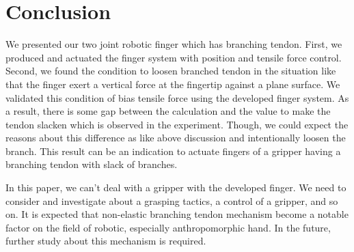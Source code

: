 \documentclass{llncs}
\begin{document}

\section{Conclusion} %
\label{sec:conclusion}
We presented our two joint robotic finger which has branching tendon.
First, we produced and actuated the finger system with position and tensile force control.
Second, we found the condition to loosen branched tendon in the situation like that the finger exert a vertical force at the fingertip against a plane surface.
We validated this condition of bias tensile force using the developed finger system.
As a result, there is some gap between the calculation and the value to make the tendon slacken which is observed in the experiment.
Though, we could expect the reasons about this difference as like above discussion and intentionally loosen the branch.
This result can be an indication to actuate fingers of a gripper having a branching tendon with slack of branches.

In this paper, we can't deal with a gripper with the developed finger.
We need to consider and investigate about a grasping tactics, a control of a gripper, and so on.
It is expected that non-elastic branching tendon mechanism become a notable factor on the field of robotic, especially anthropomorphic hand.
In the future, further study about this mechanism is required. 

\end{document}
